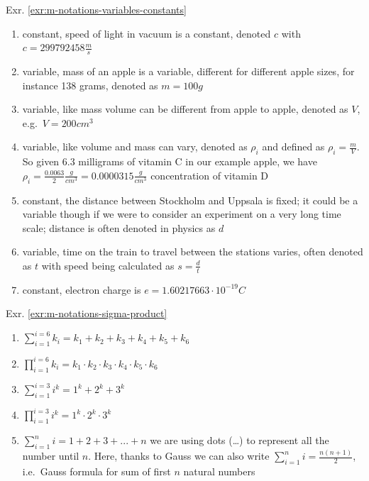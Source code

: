 \documentclass[
]{book}
\providecommand{\tightlist}{%
  \setlength{\itemsep}{0pt}\setlength{\parskip}{0pt}}
\theoremstyle{definition}
\theoremstyle{definition}
\theoremstyle{definition}
\theoremstyle{remark}
\begin{document}
Exr. \ref{exr:m-notations-variables-constants}

\begin{enumerate}
\def\labelenumi{\alph{enumi})}
\tightlist
\item
  constant, speed of light in vacuum is a constant, denoted \(c\) with \(c=299 792 458 \frac{m}{s}\)
\item
  variable, mass of an apple is a variable, different for different apple sizes, for instance 138 grams, denoted as \(m = 100 g\)
\item
  variable, like mass volume can be different from apple to apple, denoted as \(V\), e.g.~\(V = 200 cm^3\)
\item
  variable, like volume and mass can vary, denoted as \(\rho_i\) and defined as \(\rho_i=\frac{m}{V}\). So given 6.3 milligrams of vitamin C in our example apple, we have \(\rho_i=\frac{0.0063}{2}\frac{g}{cm^3} = 0.0000315 \frac{g}{cm^3}\) concentration of vitamin D
\item
  constant, the distance between Stockholm and Uppsala is fixed; it could be a variable though if we were to consider an experiment on a very long time scale; distance is often denoted in physics as \(d\)
\item
  variable, time on the train to travel between the stations varies, often denoted as \(t\) with speed being calculated as \(s = \frac{d}{t}\)
\item
  constant, electron charge is \(e = 1.60217663\cdot10^{-19} C\)
\end{enumerate}

Exr. \ref{exr:m-notations-sigma-product}

\begin{enumerate}
\def\labelenumi{\alph{enumi})}
\item
  \(\sum_{i=1}^{i=6}k_i = k_1 + k_2 + k_3 + k_4 + k_5 + k_6\)
\item
  \(\prod_{i=1}^{i=6}k_i = k_1 \cdot k_2 \cdot k_3 \cdot k_4 \cdot k_5 \cdot k_6\)
\item
  \(\sum_{i=1}^{i=3}i^k = 1^k + 2^k + 3^k\)
\item
  \(\prod_{i=1}^{i=3}i^k = 1^k \cdot 2^k \cdot 3^k\)
\item
  \(\sum_{i=1}^{n}i = 1 + 2 + 3 + ... + n\) we are using dots (\ldots) to represent all the number until \(n\). Here, thanks to Gauss we can also write \(\sum_{i=1}^{n}i = \frac{n(n+1)}{2}\), i.e.~Gauss formula for sum of first \(n\) natural numbers
\end{enumerate}
\end{document}
